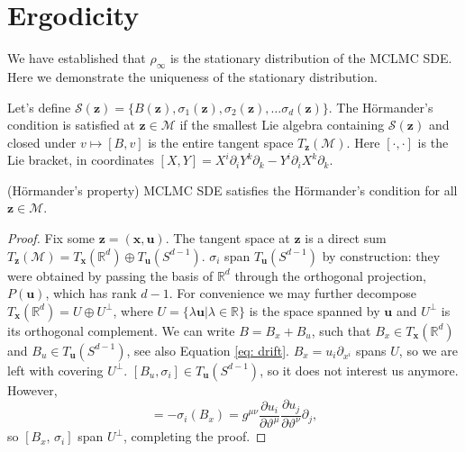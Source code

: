 \documentclass[tablecaption=bottom,wcp]{jmlr} %
\newcommand{\x}{\boldsymbol{x}}
\newcommand{\U}{\boldsymbol{u}}
\newcommand{\Z}{\boldsymbol{z}}
\begin{document}
\section{Ergodicity} \label{sec: ergodicity}

We have established that $\rho_{\infty}$ is the stationary distribution of the MCLMC SDE. Here we demonstrate the uniqueness of the stationary distribution. 

Let's define $\mathcal{S}(\Z) = \{B(\Z), \sigma_{1}(\Z), \sigma_{2}(\Z), \ldots \sigma_{d}(\Z) \}$.
The H\"ormander's condition \citep{MolecularDynamics} is satisfied at $\Z \in \mathcal{M}$ if the smallest Lie algebra containing $\mathcal{S}(\Z)$ and closed under
$v \mapsto [B, v]$ is the entire tangent space $T_{\Z}(\mathcal{M})$.
Here $[\cdot, \cdot]$ is the Lie bracket, in coordinates $[X, Y] = X^i \partial_{i} Y^k \partial_k - Y^i \partial_{i} X^k \partial_k$.


\begin{lemma} \label{hormander} (H\"ormander's property)
MCLMC SDE satisfies the H\"ormander's condition for all $\Z \in \mathcal{M}$.
\end{lemma}

\begin{proof}
    Fix some $\Z = (\x, \U)$. The tangent space at $\Z$ is a direct sum $T_{\Z}(\mathcal{M}) = T_{\x}(\mathbb{R}^d) \oplus T_{\U}(S^{d-1})$.
    $\sigma_i$ span $T_{\U}(S^{d-1})$ by construction: they were obtained by passing the basis of $\mathbb{R}^{d}$ through the orthogonal projection, $P(\U)$, which has rank $d-1$.
    For convenience we may further decompose $T_{\x}(\mathbb{R}^d) = U \oplus U^{\perp}$, where $U = \{ \lambda \U \vert \lambda \in \mathbb{R}\} $ is the space spanned by $\U$ and $U^{\perp}$ is its orthogonal complement. We can write $B = B_{x} + B_{u}$, such that $B_x \in T_{\x}(\mathbb{R}^d)$ and $B_u \in T_{\U}(S^{d-1})$, see also Equation \eqref{eq: drift}.
    $B_x = u_i \partial_{x^i}$ spans $U$, so we are left with covering $U^{\perp}$.
    $[B_{u}, \sigma_{i}] \in T_{\U}(S^{d-1})$, so it does not interest us anymore. However,
    \begin{equation*}
        [B_x,\, \sigma_i] =  - \sigma_i(B_x) = g^{\mu \nu} \frac{\partial u_i}{\partial \vartheta^{\mu}} \frac{\partial u_j}{\partial \vartheta^{\nu}} \partial_j,
    \end{equation*}
    so $[B_x,\, \sigma_i]$ span $U^{\perp}$, completing the proof.
\end{proof}
\end{document}
